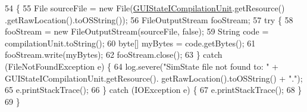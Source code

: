 \begin{DoxyCode}
54                           \{
55         File sourceFile = \textcolor{keyword}{new} File(\hyperlink{classit_1_1isislab_1_1masonassisteddocumentation_1_1mason_1_1analizer_1_1_g_u_i_state_analizer_a97ddb14f2f8fe4b54e6accc3bce4bee3}{GUIStateICompilationUnit}.getResource()
      .getRawLocation().toOSString());
56         FileOutputStream fooStream;
57         \textcolor{keywordflow}{try} \{
58             fooStream = \textcolor{keyword}{new} FileOutputStream(sourceFile, \textcolor{keyword}{false});
59             String code = compilationUnit.toString();
60             byte[] myBytes = code.getBytes();
61             fooStream.write(myBytes);
62             fooStream.close();
63         \} \textcolor{keywordflow}{catch} (FileNotFoundException e) \{
64             log.severe(\textcolor{stringliteral}{"SimState file not found to: "} + GUIStateICompilationUnit.getResource().
      getRawLocation().toOSString() + \textcolor{stringliteral}{"."});
65             e.printStackTrace();
66         \} \textcolor{keywordflow}{catch} (IOException e) \{
67             e.printStackTrace();
68         \}   
69     \}
\end{DoxyCode}


